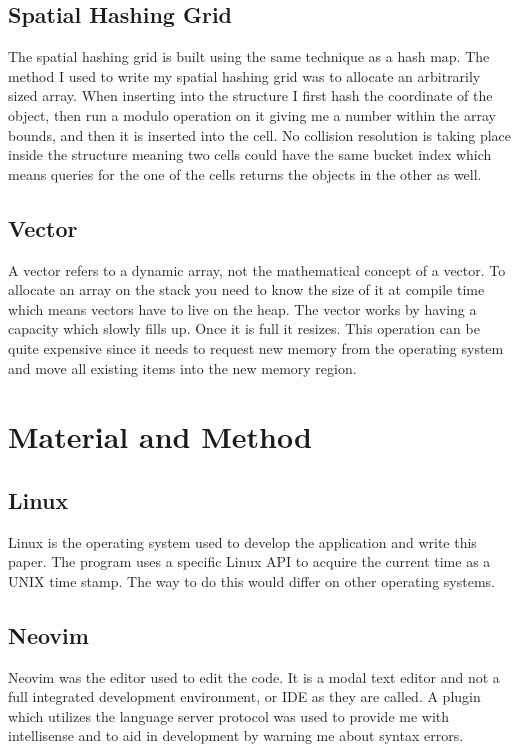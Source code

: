 \documentclass[a4paper, 12pt]{article}
\begin{document}
\subsection{Spatial Hashing Grid}
The spatial hashing grid is built using the same technique as a hash map. The
method I used to write my spatial hashing grid was to allocate an arbitrarily
sized array. When inserting into the structure I first hash the coordinate of
the object, then run a modulo operation on it giving me a number within the
array bounds, and then it is inserted into the cell. No collision resolution is
taking place inside the structure meaning two cells could have the same bucket
index which means queries for the one of the cells returns the objects in the
other as well.

\subsection{Vector}
A vector refers to a dynamic array, not the mathematical concept of a vector.
To allocate an array on the stack you need to know the size of it at compile
time which means vectors have to live on the heap. The vector works by having a
capacity which slowly fills up. Once it is full it resizes. This operation can
be quite expensive since it needs to request new memory from the operating
system and move all existing items into the new memory region.

\section{Material and Method}

\subsection{Linux}
Linux is the operating system used to develop the application and write this
paper. The program uses a specific Linux API to acquire the current time as a
UNIX time stamp. The way to do this would differ on other operating systems.

\subsection{Neovim}
Neovim was the editor used to edit the code. It is a modal text editor and not a
full integrated development environment, or IDE as they are called. A plugin
which utilizes the language server protocol was used to provide me with
intellisense and to aid in development by warning me about syntax errors.
\end{document}
